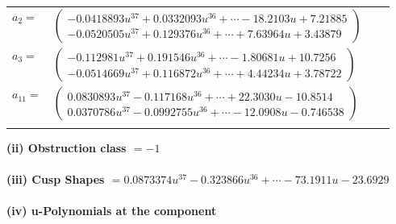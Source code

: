 \documentclass[1p]{elsarticle_modified}
\theoremstyle{definition}
\begin{document}
\begin{tabular}{m{7pt} m{180pt} m{7pt} m{180pt} }
\flushright $a_{2}=$&$\begin{pmatrix}-0.0418893 u^{37}+0.0332093 u^{36}+\cdots-18.2103 u+7.21885\\-0.0520505 u^{37}+0.129376 u^{36}+\cdots+7.63964 u+3.43879\end{pmatrix}$ \\
\flushright $a_{3}=$&$\begin{pmatrix}-0.112981 u^{37}+0.191546 u^{36}+\cdots-1.80681 u+10.7256\\-0.0514669 u^{37}+0.116872 u^{36}+\cdots+4.44234 u+3.78722\end{pmatrix}$ \\
\flushright $a_{11}=$&$\begin{pmatrix}0.0830893 u^{37}-0.117168 u^{36}+\cdots+22.3030 u-10.8514\\0.0370786 u^{37}-0.0992755 u^{36}+\cdots-12.0908 u-0.746538\end{pmatrix}$\\&\end{tabular}
\flushleft \textbf{(ii) Obstruction class $= -1$}\\~\\
\flushleft \textbf{(iii) Cusp Shapes $= 0.0873374 u^{37}-0.323866 u^{36}+\cdots-73.1911 u-23.6929$}\\~\\
\newpage\renewcommand{\arraystretch}{1}
\flushleft \textbf{(iv) u-Polynomials at the component}\newline \\
\end{document}

